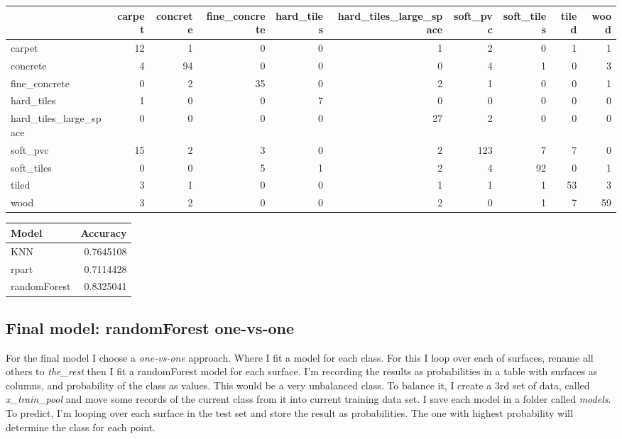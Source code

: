 \documentclass[]{article}
\newenvironment{Shaded}{\begin{snugshade}}{\end{snugshade}}
\newcommand{\DataTypeTok}[1]{\textcolor[rgb]{0.13,0.29,0.53}{#1}}
\newcommand{\KeywordTok}[1]{\textcolor[rgb]{0.13,0.29,0.53}{\textbf{#1}}}
\newcommand{\NormalTok}[1]{#1}
\newcommand{\OperatorTok}[1]{\textcolor[rgb]{0.81,0.36,0.00}{\textbf{#1}}}
\newcommand{\StringTok}[1]{\textcolor[rgb]{0.31,0.60,0.02}{#1}}
\begin{document}
\begin{longtable}[]{@{}lrrrrrrrrr@{}}
\toprule
& carpet & concrete & fine\_concrete & hard\_tiles &
hard\_tiles\_large\_space & soft\_pvc & soft\_tiles & tiled &
wood\tabularnewline
\midrule
\endhead
carpet & 12 & 1 & 0 & 0 & 1 & 2 & 0 & 1 & 1\tabularnewline
concrete & 4 & 94 & 0 & 0 & 0 & 4 & 1 & 0 & 3\tabularnewline
fine\_concrete & 0 & 2 & 35 & 0 & 2 & 1 & 0 & 0 & 1\tabularnewline
hard\_tiles & 1 & 0 & 0 & 7 & 0 & 0 & 0 & 0 & 0\tabularnewline
hard\_tiles\_large\_space & 0 & 0 & 0 & 0 & 27 & 2 & 0 & 0 &
0\tabularnewline
soft\_pvc & 15 & 2 & 3 & 0 & 2 & 123 & 7 & 7 & 0\tabularnewline
soft\_tiles & 0 & 0 & 5 & 1 & 2 & 4 & 92 & 0 & 1\tabularnewline
tiled & 3 & 1 & 0 & 0 & 1 & 1 & 1 & 53 & 3\tabularnewline
wood & 3 & 2 & 0 & 0 & 2 & 0 & 1 & 7 & 59\tabularnewline
\bottomrule
\end{longtable}

\begin{Shaded}
\end{Shaded}

\begin{longtable}[]{@{}lr@{}}
\toprule
Model & Accuracy\tabularnewline
\midrule
\endhead
KNN & 0.7645108\tabularnewline
rpart & 0.7114428\tabularnewline
randomForest & 0.8325041\tabularnewline
\bottomrule
\end{longtable}

\hypertarget{final-model-randomforest-one-vs-one}{%
\subsection{Final model: randomForest
one-vs-one}\label{final-model-randomforest-one-vs-one}}

For the final model I choose a \emph{one-vs-one} approach. Where I fit a
model for each class. For this I loop over each of surfaces, rename all
others to \emph{the\_rest} then I fit a randomForest model for each
surface. I'm recording the results as probabilities in a table with
surfaces as columns, and probability of the class as values. This would
be a very unbalanced class. To balance it, I create a 3rd set of data,
called \emph{x\_train\_pool} and move some records of the current class
from it into current training data set. I save each model in a folder
called \emph{models}. To predict, I'm looping over each surface in the
test set and store the result as probabilities. The one with highest
probability will determine the class for each point.
\end{document}
